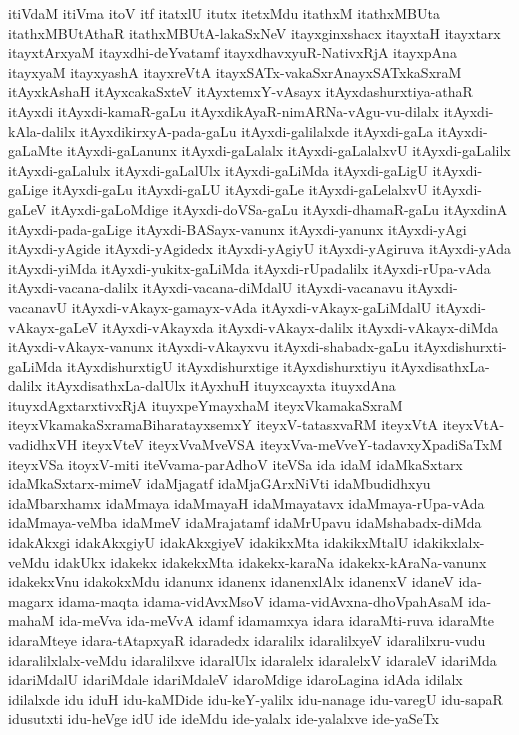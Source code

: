 {itiVdaM
itiVma
itoV
itf
itatxlU
itutx
itetxMdu
itathxM
itathxMBUta
itathxMBUtAthaR
itathxMBUtA-lakaSxNeV
itayxginxshacx
itayxtaH
itayxtarx
itayxtArxyaM
itayxdhi-deYvatamf
itayxdhavxyuR-NativxRjA
itayxpAna
itayxyaM
itayxyashA
itayxreVtA
itayxSATx-vakaSxrAnayxSATxkaSxraM
itAyxkAshaH
itAyxcakaSxteV
itAyxtemxY-vAsayx
itAyxdashurxtiya-athaR
itAyxdi
itAyxdi-kamaR-gaLu
itAyxdikAyaR-nimARNa-vAgu-vu-dilalx
itAyxdi-kAla-dalilx
itAyxdikirxyA-pada-gaLu
itAyxdi-galilalxde
itAyxdi-gaLa
itAyxdi-gaLaMte
itAyxdi-gaLanunx
itAyxdi-gaLalalx
itAyxdi-gaLalalxvU
itAyxdi-gaLalilx
itAyxdi-gaLalulx
itAyxdi-gaLalUlx
itAyxdi-gaLiMda
itAyxdi-gaLigU
itAyxdi-gaLige
itAyxdi-gaLu
itAyxdi-gaLU
itAyxdi-gaLe
itAyxdi-gaLelalxvU
itAyxdi-gaLeV
itAyxdi-gaLoMdige
itAyxdi-doVSa-gaLu
itAyxdi-dhamaR-gaLu
itAyxdinA
itAyxdi-pada-gaLige
itAyxdi-BASayx-vanunx
itAyxdi-yanunx
itAyxdi-yAgi
itAyxdi-yAgide
itAyxdi-yAgidedx
itAyxdi-yAgiyU
itAyxdi-yAgiruva
itAyxdi-yAda
itAyxdi-yiMda
itAyxdi-yukitx-gaLiMda
itAyxdi-rUpadalilx
itAyxdi-rUpa-vAda
itAyxdi-vacana-dalilx
itAyxdi-vacana-diMdalU
itAyxdi-vacanavu
itAyxdi-vacanavU
itAyxdi-vAkayx-gamayx-vAda
itAyxdi-vAkayx-gaLiMdalU
itAyxdi-vAkayx-gaLeV
itAyxdi-vAkayxda
itAyxdi-vAkayx-dalilx
itAyxdi-vAkayx-diMda
itAyxdi-vAkayx-vanunx
itAyxdi-vAkayxvu
itAyxdi-shabadx-gaLu
itAyxdishurxti-gaLiMda
itAyxdishurxtigU
itAyxdishurxtige
itAyxdishurxtiyu
itAyxdisathxLa-dalilx
itAyxdisathxLa-dalUlx
itAyxhuH
ituyxcayxta
ituyxdAna
ituyxdAgxtarxtivxRjA
ituyxpeYmayxhaM
iteyxVkamakaSxraM
iteyxVkamakaSxramaBiharatayxsemxY
iteyxV-tatasxvaRM
iteyxVtA
iteyxVtA-vadidhxVH
iteyxVteV
iteyxVvaMveVSA
iteyxVva-meVveY-tadavxyXpadiSaTxM
iteyxVSa
itoyxV-miti
iteVvama-parAdhoV
iteVSa
ida
idaM
idaMkaSxtarx
idaMkaSxtarx-mimeV
idaMjagatf
idaMjaGArxNiVti
idaMbudidhxyu
idaMbarxhamx
idaMmaya
idaMmayaH
idaMmayatavx
idaMmaya-rUpa-vAda
idaMmaya-veMba
idaMmeV
idaMrajatamf
idaMrUpavu
idaMshabadx-diMda
idakAkxgi
idakAkxgiyU
idakAkxgiyeV
idakikxMta
idakikxMtalU
idakikxlalx-veMdu
idakUkx
idakekx
idakekxMta
idakekx-karaNa
idakekx-kAraNa-vanunx
idakekxVnu
idakokxMdu
idanunx
idanenx
idanenxlAlx
idanenxV
idaneV
ida-magarx
idama-maqta
idama-vidAvxMsoV
idama-vidAvxna-dhoVpahAsaM
ida-mahaM
ida-meVva
ida-meVvA
idamf
idamamxya
idara
idaraMti-ruva
idaraMte
idaraMteye
idara-tAtapxyaR
idaradedx
idaralilx
idaralilxyeV
idaralilxru-vudu
idaralilxlalx-veMdu
idaralilxve
idaralUlx
idaralelx
idaralelxV
idaraleV
idariMda
idariMdalU
idariMdale
idariMdaleV
idaroMdige
idaroLagina
idAda
idilalx
idilalxde
idu
iduH
idu-kaMDide
idu-keY-yalilx
idu-nanage
idu-varegU
idu-sapaR
idusutxti
idu-heVge
idU
ide
ideMdu
ide-yalalx
ide-yalalxve
ide-yaSeTx
}
